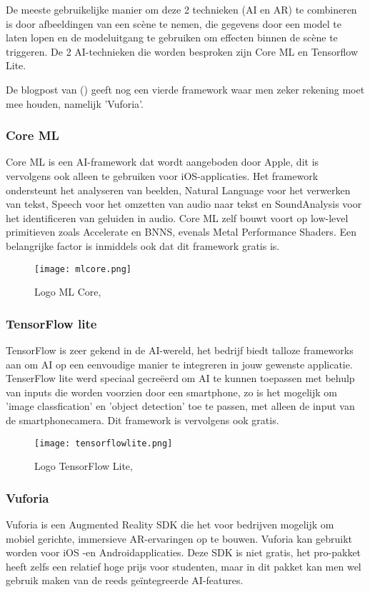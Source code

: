 De meeste gebruikelijke manier om deze 2 technieken (AI en AR) te combineren is door afbeeldingen van een scène te nemen, die gegevens door een model te laten lopen en de modeluitgang te gebruiken om effecten binnen de scène te triggeren. De 2 AI-technieken die worden besproken zijn Core ML en Tensorflow Lite.

De blogpost van \autocite{Girish2020} () geeft nog een vierde framework waar men zeker rekening moet mee houden, namelijk 'Vuforia'.

\subsubsection{Core ML}
Core ML is een AI-framework dat wordt aangeboden door Apple, dit is vervolgens ook alleen te gebruiken voor iOS-applicaties. Het framework ondersteunt het analyseren van beelden, Natural Language voor het verwerken van tekst, Speech voor het omzetten van audio naar tekst en SoundAnalysis voor het identificeren van geluiden in audio. Core ML zelf bouwt voort op low-level primitieven zoals Accelerate en BNNS, evenals Metal Performance Shaders. Een  belangrijke factor is inmiddels ook dat dit framework gratis is. \autocite{AppleML2020}


\begin{figure}[H]
	\centering
	\texttt{[image: mlcore.png]}
	\caption{Logo ML Core, \autocite{AppleML2020}}
\end{figure}

\subsubsection{TensorFlow lite}
TensorFlow is zeer gekend in de AI-wereld, het bedrijf biedt talloze frameworks aan om AI op een eenvoudige manier te integreren in jouw gewenste applicatie. TenserFlow lite werd speciaal gecreëerd om AI te kunnen toepassen met behulp van inputs die worden voorzien door een smartphone, zo is het mogelijk om 'image classfication' en 'object detection' toe te passen, met alleen de input van de smartphonecamera. Dit framework is vervolgens ook gratis. \autocite{TensorFlowLite2020}

\begin{figure}[H]
	\centering
	\texttt{[image: tensorflowlite.png]}
	\caption{Logo TensorFlow Lite, \autocite{TensorFlowLite2020}}
\end{figure}

\subsubsection{Vuforia}
Vuforia is een Augmented Reality SDK die het voor bedrijven mogelijk  om mobiel gerichte, immersieve AR-ervaringen op te bouwen. Vuforia kan gebruikt worden voor iOS -en Androidapplicaties. Deze SDK is niet gratis, het pro-pakket heeft zelfs een relatief hoge prijs voor studenten, maar in dit pakket kan men wel gebruik maken van de reeds geïntegreerde AI-features. \autocite{Girish2020}

